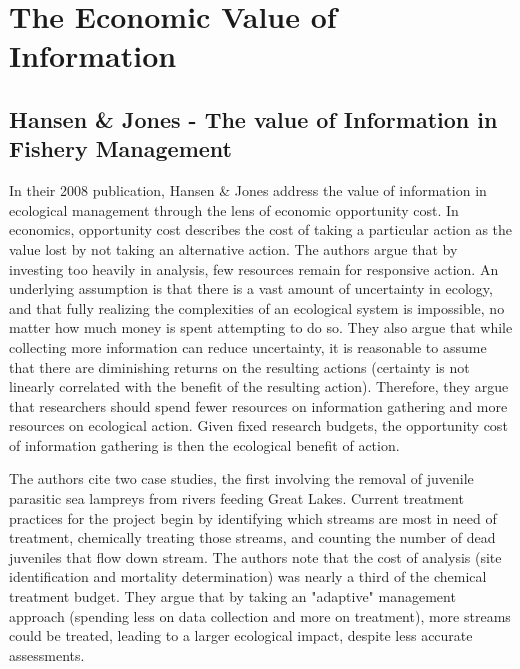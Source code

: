 \section{The Economic Value of Information}
\subsection{Hansen \& Jones - The value of Information in Fishery Management}
In their 2008 publication, Hansen \& Jones address the value of information in ecological management through the lens of economic opportunity cost.  In economics, opportunity cost describes the cost of taking a particular action as the value lost by not taking an alternative action.  The authors argue that by investing too heavily in analysis, few resources remain for responsive action.  An underlying assumption is that there is a vast amount of uncertainty in ecology, and that fully realizing the complexities of an ecological system is impossible, no matter how much money is spent attempting to do so.  They also argue that while collecting more information can reduce uncertainty, it is reasonable to assume that there are diminishing returns on the resulting actions (certainty is not linearly correlated with the benefit of the resulting action).  Therefore, they argue that researchers should spend fewer resources on information gathering and more resources on ecological action.  Given fixed research budgets, the opportunity cost of information gathering is then the ecological benefit of action.  

The authors cite two case studies, the first involving the removal of juvenile parasitic sea lampreys from rivers feeding Great Lakes.  Current treatment practices for the project begin by identifying which streams are most in need of treatment, chemically treating those streams, and counting the number of dead juveniles that flow down stream.  The authors note that the cost of analysis (site identification and mortality determination) was nearly a third of the chemical treatment budget.  They argue that by taking an "adaptive" management approach (spending less on data collection and more on treatment), more streams could be treated, leading to a larger ecological impact, despite less accurate assessments.

